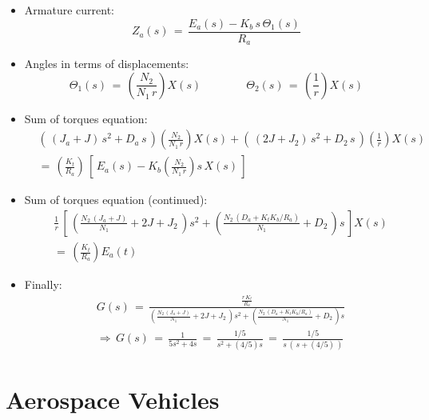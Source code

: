 \documentclass[ 10pt, xcolor = dvipsnames]{beamer}
\begin{document}
\begin{frame}[allowframebreaks]
\begin{itemize}
\item Armature current:
\[
Z_a(s) \, = \, \frac{ E_a(s) - K_b \, s \, \Theta_1(s) }{R_a}
\]
\item Angles in terms of displacements:
\[
\Theta_1(s) \, = \, \left( \frac{N_2}{N_1 \, r} \right) X(s) \qquad \qquad
\Theta_2(s) \, = \, \left( \frac{1}{r} \right) X(s)
\]
\item Sum of torques equation: 
\begin{align*}
& ( \, ( J_a + J ) \, s^2 + D_a \, s \, )\left( \frac{N_2}{N_1 \, r} \right) X(s) + 
( \, ( 2J + J_2 ) \, s^2 + D_2 \, s \, ) \left( \frac{1}{r} \right) X(s) \\
& = \, \left( \frac{K_t}{R_a} \right) \, \left[ \, E_a(s) - K_b \left( \frac{N_2}{N_1 \, r} \right) s \, X(s) \, \right]
\end{align*}
\framebreak
\item Sum of torques equation (continued):
\begin{align*}
& \frac{1}{r} \, \left[ \,
\left( \frac{N_2 \, ( J_a + J )}{N_1} + 2J + J_2 \, \right) s^2 + 
\left( \frac{N_2 \, ( D_a + K_t K_b / R_a )}{N_1} + D_2 \, \right) s \, \right] X(s) \\
& = \, \left( \frac{K_t}{R_a} \right) E_a(t)
\end{align*}
\item Finally:
\begin{align*}
& G(s) \, = \,
\frac{ \frac{r \, K_t}{R_a} }{
\left( \frac{N_2 \, ( J_a + J )}{N_1} + 2J + J_2 \, \right) s^2 + 
\left( \frac{N_2 \, ( D_a + K_t K_b / R_a )}{N_1} + D_2 \, \right) s } \\
& \Longrightarrow \, G(s)
\, = \, \frac{1}{ 5 s^2 + 4s } 
\, = \, \frac{1/5}{ s^2 + (4/5)s } 
\, = \, \frac{1/5}{ s \, ( \, s + (4/5) \, ) }
\end{align*}
\end{itemize}

\end{frame}

\section{Aerospace Vehicles}
\end{document}
